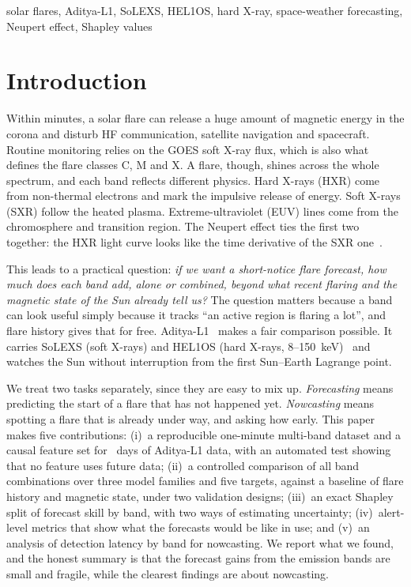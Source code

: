 \documentclass[conference]{IEEEtran}
\begin{document}
\begin{IEEEkeywords}
solar flares, Aditya-L1, SoLEXS, HEL1OS, hard X-ray, space-weather forecasting, Neupert effect, Shapley values
\end{IEEEkeywords}

\section{Introduction}
Within minutes, a solar flare can release a huge amount of magnetic energy in the corona and disturb HF communication, satellite navigation and spacecraft. Routine monitoring relies on the GOES soft X-ray flux, which is also what defines the flare classes C, M and X. A flare, though, shines across the whole spectrum, and each band reflects different physics. Hard X-rays (HXR) come from non-thermal electrons and mark the impulsive release of energy. Soft X-rays (SXR) follow the heated plasma. Extreme-ultraviolet (EUV) lines come from the chromosphere and transition region. The Neupert effect ties the first two together: the HXR light curve looks like the time derivative of the SXR one~\cite{neupert1968,dennis1993,veronig2002}.

This leads to a practical question: \emph{if we want a short-notice flare forecast, how much does each band add, alone or combined, beyond what recent flaring and the magnetic state of the Sun already tell us?} The question matters because a band can look useful simply because it tracks ``an active region is flaring a lot'', and flare history gives that for free. Aditya-L1~\cite{tripathi2022} makes a fair comparison possible. It carries SoLEXS (soft X-rays) and HEL1OS (hard X-rays, 8--150~keV)~\cite{nandi2025} and watches the Sun without interruption from the first Sun--Earth Lagrange point.

We treat two tasks separately, since they are easy to mix up. \emph{Forecasting} means predicting the start of a flare that has not happened yet. \emph{Nowcasting} means spotting a flare that is already under way, and asking how early. This paper makes five contributions: (i)~a reproducible one-minute multi-band dataset and a causal feature set for \NumDays\ days of Aditya-L1 data, with an automated test showing that no feature uses future data; (ii)~a controlled comparison of all band combinations over three model families and five targets, against a baseline of flare history and magnetic state, under two validation designs; (iii)~an exact Shapley split of forecast skill by band, with two ways of estimating uncertainty; (iv)~alert-level metrics that show what the forecasts would be like in use; and (v)~an analysis of detection latency by band for nowcasting. We report what we found, and the honest summary is that the forecast gains from the emission bands are small and fragile, while the clearest findings are about nowcasting.
\end{document}
